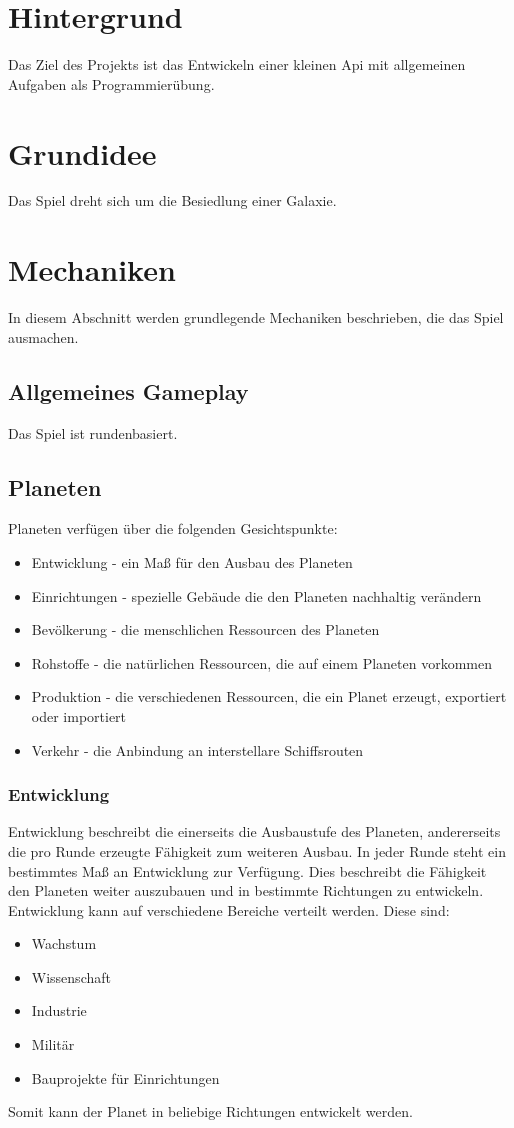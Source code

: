 \documentclass[11pt, a4paper]{article}
\begin{document}
\section{Hintergrund}
Das Ziel des Projekts ist das Entwickeln einer kleinen Api mit allgemeinen Aufgaben als Programmierübung.
%
\section{Grundidee}
Das Spiel dreht sich um die Besiedlung einer Galaxie.
%
\section{Mechaniken}
In diesem Abschnitt werden grundlegende Mechaniken beschrieben, die das Spiel ausmachen.
%
\subsection{Allgemeines Gameplay}
Das Spiel ist rundenbasiert.
%
\subsection{Planeten}
Planeten verfügen über die folgenden Gesichtspunkte:
\begin{itemize}
    \item Entwicklung - ein Maß für den Ausbau des Planeten
    \item Einrichtungen - spezielle Gebäude die den Planeten nachhaltig verändern
    \item Bevölkerung - die menschlichen Ressourcen des Planeten
    \item Rohstoffe - die natürlichen Ressourcen, die auf einem Planeten vorkommen
    \item Produktion - die verschiedenen Ressourcen, die ein Planet erzeugt, exportiert oder importiert
    \item Verkehr - die Anbindung an interstellare Schiffsrouten
\end{itemize}
%
\subsubsection{Entwicklung}
Entwicklung beschreibt die einerseits die Ausbaustufe des Planeten, andererseits die pro Runde erzeugte
Fähigkeit zum weiteren Ausbau. In jeder Runde steht ein bestimmtes Maß an Entwicklung zur Verfügung.
Dies beschreibt die Fähigkeit den Planeten weiter auszubauen und in bestimmte Richtungen zu entwickeln.
Entwicklung kann auf verschiedene Bereiche verteilt werden. Diese sind:
\begin{itemize}
    \item Wachstum
    \item Wissenschaft
    \item Industrie
    \item Militär
    \item Bauprojekte für Einrichtungen
\end{itemize}
%
Somit kann der Planet in beliebige Richtungen entwickelt werden.
%
\end{document}
